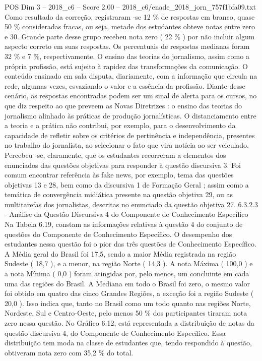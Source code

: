 \begin{textsample}{POS Dim 3 – 2018\_c6 – Score 2.00 – 2018\_c6/enade\_2018\_jorn\_757f1bfa09.txt}
Como resultado da correção, registraram -se 12 \% de respostas em branco, quase 50 \% consideradas fracas, ou seja, metade dos estudantes obteve notas entre zero e 30.
Grande parte desse grupo recebeu nota zero ( 22 \% ) por não incluir algum aspecto correto em suas respostas.
Os percentuais de respostas medianas foram 32 \% e 7 \%, respectivamente.
O ensino das teorias do jornalismo, assim como a própria profissão, está sujeito à rapidez das transformações da comunicação.
O conteúdo ensinado em sala disputa, diariamente, com a informação que circula na rede, algumas vezes, esvaziando o valor e a essência da profissão.
Diante desse cenário, as respostas encontradas podem ser um sinal de alerta para os cursos, no que diz respeito ao que preveem as Novas Diretrizes : o ensino das teorias do jornalismo alinhado às práticas de produção jornalísticas.
O distanciamento entre a teoria e a prática não contribui, por exemplo, para o desenvolvimento da capacidade de refletir sobre os critérios de pertinência e independência, presentes no trabalho do jornalista, ao selecionar o fato que vira notícia ao ser veiculado.
Percebeu -se, claramente, que os estudantes recorreram a elementos dos enunciados das questões objetivas para responder à questão discursiva 3.
Foi comum encontrar referência às fake news, por exemplo, tema das questões objetivas 13 e 28, bem como da discursiva 1 de Formação Geral ; assim como a temática de convergência midiática presente na questão objetiva 29, ou as multitarefas dos jornalistas, descritas no enunciado da questão objetiva 27. 6.3.2.3 - Análise da Questão Discursiva 4 do Componente de Conhecimento Específico Na Tabela 6.19, constam as informações relativas à questão 4 do conjunto de questões do Componente de Conhecimento Específico.
O desempenho dos estudantes nessa questão foi o pior das três questões de Conhecimento Específico.
A Média geral do Brasil foi 17,5, sendo a maior Média registrada na região Sudeste ( 18,7 ), e a menor, na região Norte ( 14,3 ).
A nota Máxima ( 100,0 ) e a nota Mínima ( 0,0 ) foram atingidas por, pelo menos, um concluinte em cada uma das regiões do Brasil.
A Mediana em todo o Brasil foi zero, o mesmo valor foi obtido em quatro das cinco Grandes Regiões, a exceção foi a região Sudeste ( 20,0 ).
Isso indica que, tanto no Brasil como um todo quanto nas regiões Norte, Nordeste, Sul e Centro-Oeste, pelo menos 50 \% dos participantes tiraram nota zero nessa questão.
No Gráfico 6.12, está representada a distribuição de notas da questão discursiva 4, do Componente de Conhecimento Específico.
Essa distribuição tem moda na classe de estudantes que, tendo respondido à questão, obtiveram nota zero com 35,2 \% do total.

\end{textsample}
